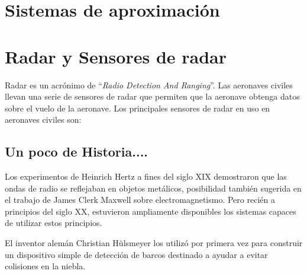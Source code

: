 \section{Sistemas de aproximaci\'on}
\label{sec:06.sistemas.de.aproximacion}








\section{Radar y Sensores de radar}
\label{sec:U06.05.sensores.de.radar}

Radar es un acrónimo de ``\emph{Radio Detection And Ranging}''.
Las aeronaves civiles llevan una serie de sensores de radar que permiten que la aeronave obtenga datos sobre el vuelo de la aeronave. Los principales sensores de radar en uso en aeronaves civiles son:




\subsection{Un poco de Historia....}
\label{sec:06.radar.historia}

Los experimentos de Heinrich Hertz a fines del siglo XIX  demostraron que las ondas de radio se reflejaban en objetos metálicos,  posibilidad también  sugerida en el trabajo  de James Clerk Maxwell sobre electromagnetismo. Pero recién a  principios del siglo XX, estuvieron ampliamente disponibles los sistemas capaces de utilizar estos principios.

El inventor alemán Christian H\"ulsmeyer los utilizó por primera vez para construir un dispositivo simple de detección de barcos destinado a ayudar a evitar colisiones en la niebla.

